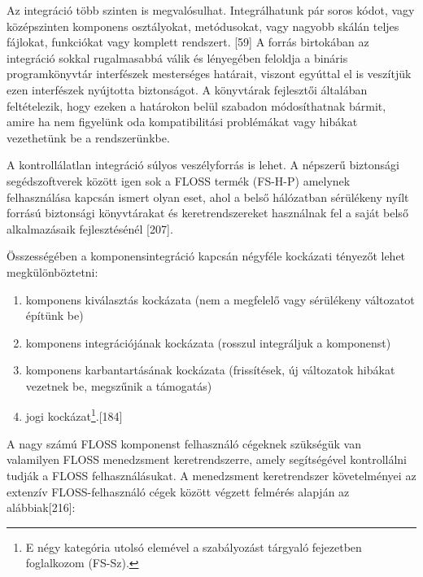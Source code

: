 \documentclass[12pt,magyar,a4paper,oneside]{scrreprt}
\providecommand{\tightlist}{%
  \setlength{\itemsep}{0pt}\setlength{\parskip}{0pt}}
\begin{document}
Az integráció több szinten is megvalósulhat. Integrálhatunk pár soros
kódot, vagy középszinten komponens osztályokat, metódusokat, vagy
nagyobb skálán teljes fájlokat, funkciókat vagy komplett rendszert.
{[}59{]} A forrás birtokában az integráció sokkal rugalmasabbá válik és
lényegében feloldja a bináris programkönyvtár interfészek mesterséges
határait, viszont egyúttal el is veszítjük ezen interfészek nyújtotta
biztonságot. A könyvtárak fejlesztői általában feltételezik, hogy ezeken
a határokon belül szabadon módosíthatnak bármit, amire ha nem figyelünk
oda kompatibilitási problémákat vagy hibákat vezethetünk be a
rendszerünkbe.

A kontrollálatlan integráció súlyos veszélyforrás is lehet. A népszerű
biztonsági segédszoftverek között igen sok a FLOSS termék (FS-H-P)
amelynek felhasználása kapcsán ismert olyan eset, ahol a belső
hálózatban sérülékeny nyílt forrású biztonsági könyvtárakat és
keretrendszereket használnak fel a saját belső alkalmazásaik
fejlesztésénél {[}207{]}.

Összességében a komponensintegráció kapcsán négyféle kockázati tényezőt
lehet megkülönböztetni:

\begin{enumerate}
\def\labelenumi{\arabic{enumi}.}
\tightlist
\item
  komponens kiválasztás kockázata (nem a megfelelő vagy sérülékeny
  változatot építünk be)
\item
  komponens integrációjának kockázata (rosszul integráljuk a komponenst)
\item
  komponens karbantartásának kockázata (frissítések, új változatok
  hibákat vezetnek be, megszűnik a támogatás)
\item
  jogi kockázat\footnote{E négy kategória utolsó elemével a szabályozást
    tárgyaló fejezetben foglalkozom (FS-Sz).}.{[}184{]}
\end{enumerate}

A nagy számú FLOSS komponenst felhasználó cégeknek szükségük van
valamilyen FLOSS menedzsment keretrendszerre, amely segítségével
kontrollálni tudják a FLOSS felhasználásukat. A menedzsment
keretrendszer követelményei az extenzív FLOSS-felhasználó cégek között
végzett felmérés alapján az alábbiak{[}216{]}:
\end{document}

